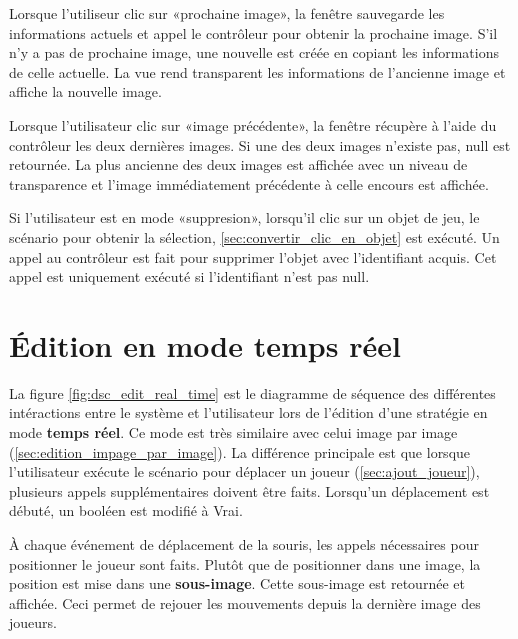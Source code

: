 Lorsque l'utiliseur clic sur «prochaine image», la fenêtre sauvegarde les informations actuels et appel le contrôleur pour obtenir la prochaine image.
S'il n'y a pas de prochaine image, une nouvelle est créée en copiant les informations de celle actuelle.
La vue rend transparent les informations de l'ancienne image et affiche la nouvelle image.

Lorsque l'utilisateur clic sur «image précédente», la fenêtre récupère à l'aide du contrôleur les deux dernières images.
Si une des deux images n'existe pas, null est retournée.
La plus ancienne des deux images est affichée avec un niveau de transparence et l'image immédiatement précédente à celle encours est affichée.

Si l'utilisateur est en mode «suppresion», lorsqu'il clic sur un objet de jeu, le scénario pour obtenir la sélection, \ref{sec:convertir_clic_en_objet} est exécuté.
Un appel au contrôleur est fait pour supprimer l'objet avec l'identifiant acquis.
Cet appel est uniquement exécuté si l'identifiant n'est pas null.

\section{Édition en mode temps réel}
\label{sec:edition_temps_reel}


La figure \ref{fig:dsc_edit_real_time} est le diagramme de séquence des différentes intéractions entre le système et l'utilisateur lors de l'édition d'une stratégie en mode \textbf{temps réel}.
Ce mode est très similaire avec celui image par image (\ref{sec:edition_impage_par_image}).
La différence principale est que lorsque l'utilisateur exécute le scénario pour déplacer un joueur (\ref{sec:ajout_joueur}), plusieurs appels supplémentaires doivent être faits.
Lorsqu'un déplacement est débuté, un booléen est modifié à Vrai.

À chaque événement de déplacement de la souris, les appels nécessaires pour positionner le joueur sont faits.
Plutôt que de positionner dans une image, la position est mise dans une \textbf{sous-image}.
Cette sous-image est retournée et affichée.
Ceci permet de rejouer les mouvements depuis la dernière image des joueurs.

